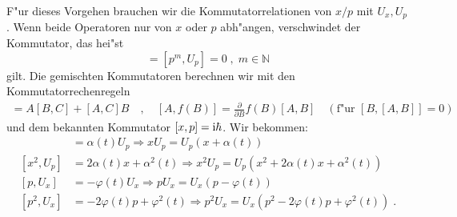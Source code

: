   F"ur dieses Vorgehen brauchen wir die Kommutatorrelationen von $x/p$ mit $U_x,U_p$.
  Wenn beide Operatoren nur von $x$ oder $p$ abh"angen, verschwindet der Kommutator, das hei"st
  \begin{equation}
    [x^m,U_x]=[p^m,U_p]=0\;,\; m \in \mathbb{N}
  \end{equation}
  gilt.
  Die gemischten Kommutatoren berechnen wir mit den Kommutatorrechenregeln
  \begin{align}
    [AB,C]=A[B,C]+[A,C]B\quad,\quad [A,f(B)]=\frac{\partial}{\partial B}f(B)[A,B]\quad (\text{f"ur $[B,[A,B]]=0$})
  \end{align}
  und dem bekannten Kommutator $[x,p]=\text i \hbar$.
  Wir bekommen:
  \begin{align}
    [x,U_p]&=\alpha(t)U_p\Rightarrow xU_p=U_p(x+\alpha(t)) \\
    [x^2,U_p]&=2\alpha(t)x+\alpha^2(t)\Rightarrow x^2U_p=U_p(x^2+2\alpha(t)x+\alpha^2(t))\\
    [p,U_x]&=-\varphi(t)U_x\Rightarrow pU_x=U_x(p-\varphi(t)) \\
    [p^2,U_x]&=-2\varphi(t)p+\varphi^2(t)\Rightarrow p^2U_x=U_x(p^2-2\varphi(t)p+\varphi^2(t)) \; .
  \end{align}

